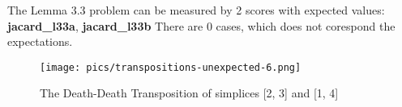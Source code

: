 \documentclass{article}
\begin{document}
    \par The Lemma 3.3 problem can be measured by 2 scores with expected 
    values: \textbf{jacard\_l33a}, \textbf{jacard\_l33b}
    There are 0 cases, which does not corespond the expectations. 
    
    \begin{figure}[ht]
    \centering
    \texttt{[image: pics/transpositions-unexpected-6.png]}
    \caption{The Death-Death Transposition of simplices [2, 3] and [1, 4]}
    \label{fig:unexpected6}
    \end{figure}
    
\end{document}
